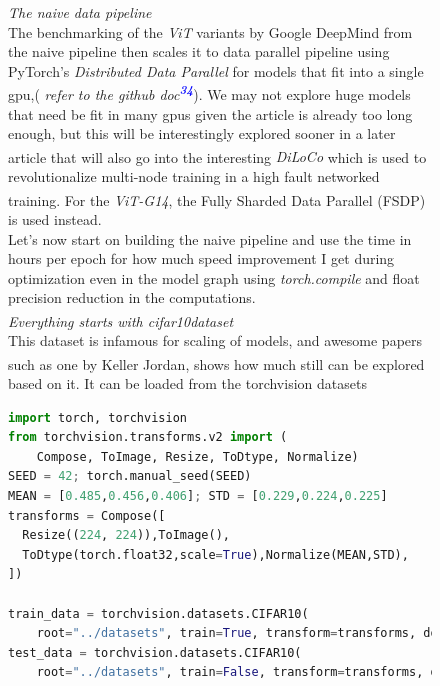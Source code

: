 \documentclass[12pt]{article}
\newcommand{\customtext}[3]{%
    \vspace{#2} %
    \fontsize{13}{8}\textcolor{#1}{\textit{#3}}%
}
\newcommand{\sidecite}[1]{\textsuperscript{\textcolor{blue}{\textbf{\scriptsize#1}}}}
\newcommand{\maincitecount}{\sidecite{\stepcounter{maincite}\themaincite}}
\begin{document}
\begin{figure}[!htb]
    \begin{minipage}[t]{0.65\textwidth}
    \raggedright
    \customtext{xtitle}{0em}{The naive data pipeline}\\
    The benchmarking of the {\it ViT} variants by Google DeepMind from the naive pipeline then 
    scales it to data parallel pipeline using PyTorch's {\it Distributed Data Parallel} for models 
    that fit into a single gpu,( {\it \small refer to the github doc\sidecite{34}}). We may not 
    explore huge models that need be fit in many gpus given the article is already too long 
    enough, but this will be interestingly explored sooner in a later article that will also go 
    into the interesting {\it \small DiLoCo\maincitecount} which is used to revolutionalize 
    multi-node training in a high fault networked training\maincitecount. For the {\it ViT-G14}, 
    the Fully Sharded Data Parallel (FSDP) is used instead.\\
    Let's now start on building the naive pipeline and use the time in hours per epoch for how much 
    speed improvement I get during optimization even in the model graph using {\it torch.compile} and 
    float precision reduction in the computations.\\
    \vspace{1em}
    \customtext{xtitle}{0em}{Everything starts with cifar10\maincitecount dataset}\\
    This dataset is infamous for scaling of models, and awesome papers such as one 
    by Keller Jordan\maincitecount, shows how much still can be explored based on it.
    It can be loaded from the torchvision datasets
\begin{lstlisting}[language=python,style=python,basicstyle=\ttfamily\scriptsize]
import torch, torchvision 
from torchvision.transforms.v2 import (
    Compose, ToImage, Resize, ToDtype, Normalize)
SEED = 42; torch.manual_seed(SEED)
MEAN = [0.485,0.456,0.406]; STD = [0.229,0.224,0.225]
transforms = Compose([
  Resize((224, 224)),ToImage(),
  ToDtype(torch.float32,scale=True),Normalize(MEAN,STD),
])

train_data = torchvision.datasets.CIFAR10(
    root="../datasets", train=True, transform=transforms, download=True)
test_data = torchvision.datasets.CIFAR10(
    root="../datasets", train=False, transform=transforms, download=True)


\end{lstlisting}
\end{minipage}
\end{figure}
\end{document}
